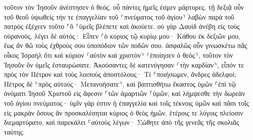\documentclass{openreader}
\begin{document}
τοῦτον τὸν Ἰησοῦν ἀνέστησεν ὁ θεός, οὗ πάντες ἡμεῖς ἐσμεν μάρτυρες. 
τῇ δεξιᾷ οὖν τοῦ θεοῦ ὑψωθεὶς τήν τε ἐπαγγελίαν τοῦ ⸂πνεύματος τοῦ ἁγίου⸃ λαβὼν παρὰ τοῦ πατρὸς ἐξέχεεν τοῦτο ⸀ὃ ⸀ὑμεῖς βλέπετε καὶ ἀκούετε. 
οὐ γὰρ Δαυὶδ ἀνέβη εἰς τοὺς οὐρανούς, λέγει δὲ αὐτός· Εἶπεν ⸀ὁ κύριος τῷ κυρίῳ μου· Κάθου ἐκ δεξιῶν μου, 
ἕως ἂν θῶ τοὺς ἐχθρούς σου ὑποπόδιον τῶν ποδῶν σου. 
ἀσφαλῶς οὖν γινωσκέτω πᾶς οἶκος Ἰσραὴλ ὅτι καὶ κύριον ⸂αὐτὸν καὶ χριστὸν⸃ ⸂ἐποίησεν ὁ θεός⸃, τοῦτον τὸν Ἰησοῦν ὃν ὑμεῖς ἐσταυρώσατε. 
Ἀκούσαντες δὲ κατενύγησαν ⸂τὴν καρδίαν⸃, εἶπόν τε πρὸς τὸν Πέτρον καὶ τοὺς λοιποὺς ἀποστόλους· Τί ⸀ποιήσωμεν, ἄνδρες ἀδελφοί; 
Πέτρος δὲ ⸂πρὸς αὐτούς· Μετανοήσατε⸃, καὶ βαπτισθήτω ἕκαστος ὑμῶν ⸀ἐπὶ τῷ ὀνόματι Ἰησοῦ Χριστοῦ εἰς ἄφεσιν ⸀τῶν ἁμαρτιῶν ⸀ὑμῶν, καὶ λήμψεσθε τὴν δωρεὰν τοῦ ἁγίου πνεύματος· 
ὑμῖν γάρ ἐστιν ἡ ἐπαγγελία καὶ τοῖς τέκνοις ὑμῶν καὶ πᾶσι τοῖς εἰς μακρὰν ὅσους ἂν προσκαλέσηται κύριος ὁ θεὸς ἡμῶν. 
ἑτέροις τε λόγοις πλείοσιν διεμαρτύρατο, καὶ παρεκάλει ⸀αὐτοὺς λέγων· Σώθητε ἀπὸ τῆς γενεᾶς τῆς σκολιᾶς ταύτης. 
\end{document}
